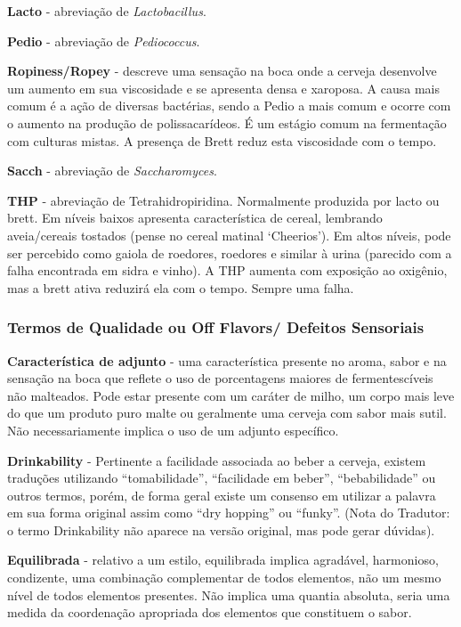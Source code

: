 \textbf{Lacto} - abreviação de \textit{Lactobacillus}.

\textbf{Pedio} - abreviação de \textit{Pediococcus}.

\textbf{Ropiness/Ropey} - descreve uma sensação na boca onde a cerveja desenvolve um aumento em sua viscosidade e se apresenta densa e xaroposa. A causa mais comum é a ação de diversas bactérias, sendo a Pedio a mais comum e ocorre com o aumento na produção de polissacarídeos. É um estágio comum na fermentação com culturas mistas. A presença de Brett reduz esta viscosidade com o tempo.

\textbf{Sacch} - abreviação de \textit{Saccharomyces}.

\textbf{THP} - abreviação de Tetrahidropiridina. Normalmente produzida por lacto ou brett. Em níveis baixos apresenta característica de cereal, lembrando aveia/cereais tostados (pense no cereal matinal ‘Cheerios’). Em altos níveis, pode ser percebido como gaiola de roedores, roedores e similar à urina (parecido com a falha encontrada em sidra e vinho). A THP aumenta com exposição ao oxigênio, mas a brett ativa reduzirá ela com o tempo. Sempre uma falha.

\subsubsection*{Termos de Qualidade ou Off Flavors/ Defeitos Sensoriais}

\textbf{Característica de adjunto} - uma característica presente no aroma, sabor e na sensação na boca que reflete o uso de porcentagens maiores de fermentescíveis não malteados.  Pode estar presente com um caráter de milho, um corpo mais leve do que um produto puro malte ou geralmente uma cerveja com sabor mais sutil. Não necessariamente implica o uso de um adjunto específico.

\textbf{Drinkability} - Pertinente a facilidade associada ao beber a cerveja, existem traduções utilizando “tomabilidade”, “facilidade em beber”, “bebabilidade” ou outros termos, porém, de forma geral existe um consenso em utilizar a palavra em sua forma original assim como “dry hopping” ou “funky”. (Nota do Tradutor: o termo Drinkability não aparece na versão original, mas pode gerar dúvidas).

\textbf{Equilibrada} - relativo a um estilo, equilibrada implica agradável, harmonioso, condizente, uma combinação complementar de todos elementos, não um mesmo nível de todos elementos presentes. Não implica uma quantia absoluta, seria uma medida da coordenação apropriada dos elementos que constituem o sabor.

